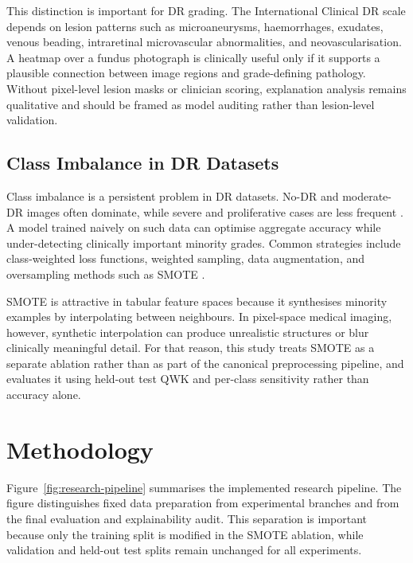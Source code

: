 \documentclass[11pt,a4paper]{article}
\begin{document}
This distinction is important for DR grading. The International Clinical DR scale depends on lesion patterns such as microaneurysms, haemorrhages, exudates, venous beading, intraretinal microvascular abnormalities, and neovascularisation. A heatmap over a fundus photograph is clinically useful only if it supports a plausible connection between image regions and grade-defining pathology. Without pixel-level lesion masks or clinician scoring, explanation analysis remains qualitative and should be framed as model auditing rather than lesion-level validation.

\subsection{Class Imbalance in DR Datasets}
Class imbalance is a persistent problem in DR datasets. No-DR and moderate-DR images often dominate, while severe and proliferative cases are less frequent \cite{atwany2022}. A model trained naively on such data can optimise aggregate accuracy while under-detecting clinically important minority grades. Common strategies include class-weighted loss functions, weighted sampling, data augmentation, and oversampling methods such as SMOTE \cite{smote,shorten2019}.

SMOTE is attractive in tabular feature spaces because it synthesises minority examples by interpolating between neighbours. In pixel-space medical imaging, however, synthetic interpolation can produce unrealistic structures or blur clinically meaningful detail. For that reason, this study treats SMOTE as a separate ablation rather than as part of the canonical preprocessing pipeline, and evaluates it using held-out test QWK and per-class sensitivity rather than accuracy alone.

\section{Methodology}
Figure~\ref{fig:research-pipeline} summarises the implemented research
pipeline. The figure distinguishes fixed data preparation from experimental
branches and from the final evaluation and explainability audit. This
separation is important because only the training split is modified in the
SMOTE ablation, while validation and held-out test splits remain unchanged for
all experiments.
\end{document}
